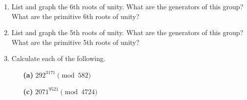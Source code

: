 {\begin{enumerate}
\begin{minipage}[t]{4.6in}
\begin{minipage}[t]{2.25in}
\begin{itemize}
 \item[{\bf (a)}]
$|z| = | \overline{z}|$
 
 
 \item[{\bf (c)}]
$z^{-1} = \overline{z} / |z|^2$
 
 \item[{\bf (e)}]
$|z - w| \geq | |z| - |w||$
 
\end{itemize}
\end{minipage} \hfill
\begin{minipage}[t]{2.25in}
\begin{itemize}
 
 \item[{\bf (b)}]
$z \overline{z} = |z|^2$
 
 \item[{\bf (d)}]
$|z +w| \leq |z| + |w|$
 
 \item[{\bf (f)}]
$|z w| = |z|  |w|$
 
\end{itemize}
\end{minipage}
\end{minipage}
 
\vspace{2pt}        %
 
 
\bf\item\rm
List and graph the 6th roots of unity.  What are the generators of
this group?  What are the primitive 6th roots of unity?
 
 
\bf\item\rm
List and graph the 5th roots of unity.  What are the generators of
this group?  What are the primitive 5th roots of unity? 
 
 
\bf\item\rm
Calculate each of the following.
 
 
\vspace{3pt}        %
 
\hspace{-7pt}
\begin{minipage}[t]{4.6in}
\noindent
\begin{minipage}[t]{2.25in}
\begin{itemize}
 
 \item[{\bf (a)}]
$292^{3171} \pmod{ 582}$
 
 \item[{\bf (c)}]
$2071^{ 9521} \pmod{ 4724}$
 

\end{itemize}
\end{minipage}
\end{minipage}
\end{enumerate}}
